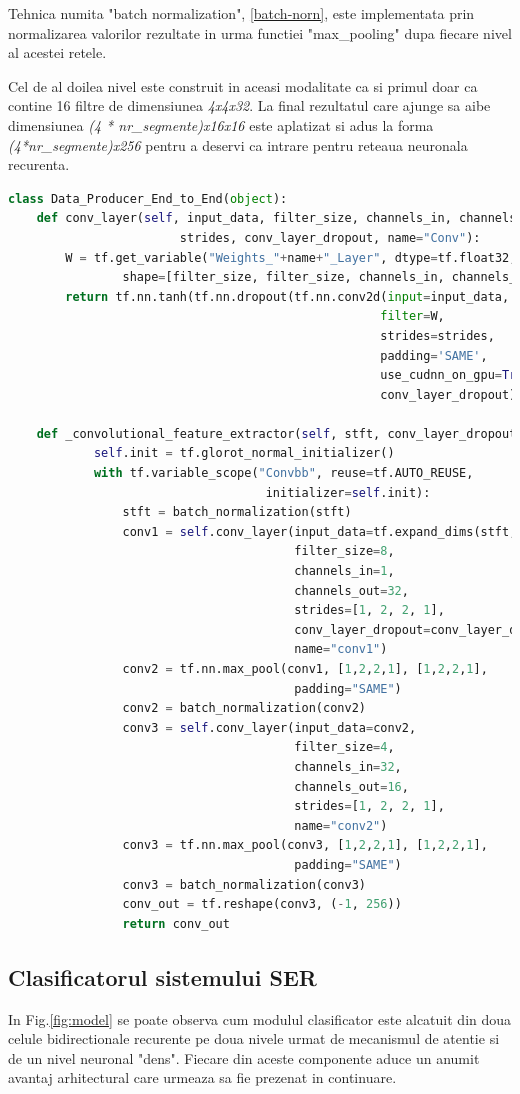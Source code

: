 \documentclass[a4paper,12pt]{book}
\begin{document}
				Tehnica numita "batch normalization", \ref{batch-norn}, este implementata prin normalizarea  valorilor rezultate in urma functiei  "max\_pooling" dupa fiecare nivel al acestei retele. \par 
				Cel de al doilea nivel este construit in aceasi modalitate ca si primul doar ca contine 16 filtre de dimensiunea \textit{4x4x32}. La final rezultatul care ajunge sa aibe dimensiunea \textit{(4 * nr\_segmente)x16x16} este aplatizat si adus la forma \textit{(4*nr\_segmente)x256} pentru a deservi ca intrare pentru reteaua neuronala recurenta. 
				\begin{lstlisting}[language=Python, caption={Implementarea nivelelor convolutionale care realizeaza extragerea caracteristicilor in maniera end-to-end folosind procedurile librariei Tensorflow.}, xleftmargin=-1cm, label=cnn_code]
class Data_Producer_End_to_End(object):
	def conv_layer(self, input_data, filter_size, channels_in, channels_out, 
						strides, conv_layer_dropout, name="Conv"):
		W = tf.get_variable("Weights_"+name+"_Layer", dtype=tf.float32, 
				shape=[filter_size, filter_size, channels_in, channels_out])
		return tf.nn.tanh(tf.nn.dropout(tf.nn.conv2d(input=input_data, 
													filter=W, 
													strides=strides, 
													padding='SAME', 
													use_cudnn_on_gpu=True), 
													conv_layer_dropout))
					
	def _convolutional_feature_extractor(self, stft, conv_layer_dropout):
			self.init = tf.glorot_normal_initializer()
			with tf.variable_scope("Convbb", reuse=tf.AUTO_REUSE, 
									initializer=self.init):
				stft = batch_normalization(stft)
				conv1 = self.conv_layer(input_data=tf.expand_dims(stft,axis=3),
										filter_size=8, 
										channels_in=1, 
										channels_out=32, 
										strides=[1, 2, 2, 1], 
										conv_layer_dropout=conv_layer_dropout, 
										name="conv1")			
				conv2 = tf.nn.max_pool(conv1, [1,2,2,1], [1,2,2,1], 
										padding="SAME")
				conv2 = batch_normalization(conv2)
				conv3 = self.conv_layer(input_data=conv2, 
										filter_size=4, 
										channels_in=32,
										channels_out=16, 
										strides=[1, 2, 2, 1], 										conv_layer_dropout=conv_layer_dropout, 
										name="conv2")				
				conv3 = tf.nn.max_pool(conv3, [1,2,2,1], [1,2,2,1], 
										padding="SAME")
				conv3 = batch_normalization(conv3)
				conv_out = tf.reshape(conv3, (-1, 256))
				return conv_out	\end{lstlisting}		
			
			\subsection{Clasificatorul sistemului SER} \label{clasif_prac}
				In Fig.\ref{fig:model} se poate observa cum modulul clasificator este alcatuit din doua celule bidirectionale recurente pe doua nivele urmat de mecanismul de atentie si de un nivel neuronal "dens". Fiecare din aceste componente aduce un anumit avantaj arhitectural care urmeaza sa fie prezenat in continuare. \par
				
\end{document}
